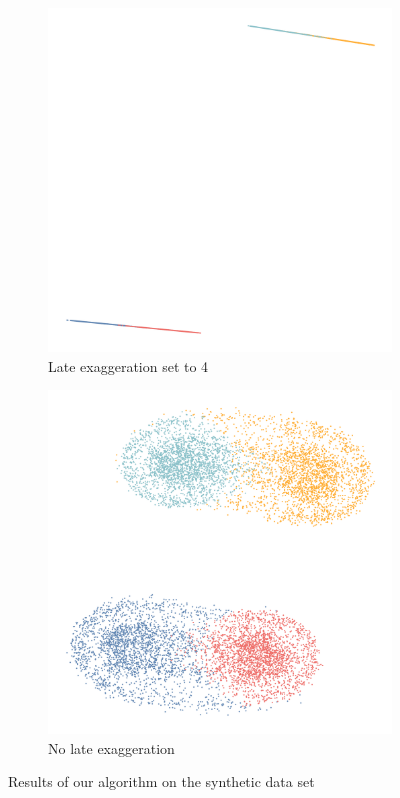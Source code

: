 \begin{figure}[tbp]
  \centering
  \begin{subfigure}{.4\linewidth}
    \centering
    \includegraphics[width=\linewidth]{img/syn2_late_exagg}
    \caption{Late exaggeration set to 4}
  \end{subfigure}
  \begin{subfigure}{.4\linewidth}
    \centering
    \includegraphics[width=\linewidth]{img/syn2_no_late_exagg}
    \caption{No late exaggeration}
  \end{subfigure}
  \caption{Results of our algorithm on the synthetic data set}
  \label{fig:ktsne-syn2}
\end{figure}

